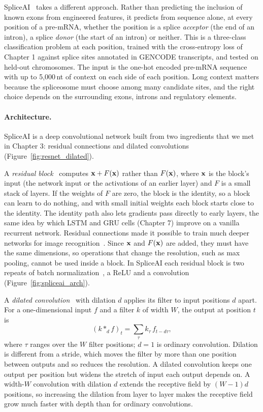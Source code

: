 SpliceAI~\citep{jaganathan2019} takes a different approach. Rather than predicting the inclusion of known exons from engineered features, it predicts from sequence alone, at every position of a pre-mRNA, whether the position is a splice \emph{acceptor} (the end of an intron), a splice \emph{donor} (the start of an intron) or neither. This is a three-class classification problem at each position, trained with the cross-entropy loss of Chapter 1 against splice sites annotated in GENCODE transcripts, and tested on held-out chromosomes. The input is the one-hot encoded pre-mRNA sequence with up to 5,000\,nt of context on each side of each position. Long context matters because the spliceosome must choose among many candidate sites, and the right choice depends on the surrounding exons, introns and regulatory elements.

\paragraph{Architecture.} SpliceAI is a deep convolutional network built from two ingredients that we met in Chapter 3: residual connections and dilated convolutions (Figure~\ref{fig:resnet_dilated}).

A \emph{residual block}~\citep{he2016} computes $\mathbf{x}+F(\mathbf{x})$ rather than $F(\mathbf{x})$, where $\mathbf{x}$ is the block's input (the network input or the activations of an earlier layer) and $F$ is a small stack of layers. If the weights of $F$ are zero, the block is the identity, so a block can learn to do nothing, and with small initial weights each block starts close to the identity. The identity path also lets gradients pass directly to early layers, the same idea by which LSTM and GRU cells (Chapter 7) improve on a vanilla recurrent network. Residual connections made it possible to train much deeper networks for image recognition~\citep{he2016}. Since $\mathbf{x}$ and $F(\mathbf{x})$ are added, they must have the same dimensions, so operations that change the resolution, such as max pooling, cannot be used inside a block. In SpliceAI each residual block is two repeats of batch normalization~\citep{ioffe2015}, a ReLU and a convolution (Figure~\ref{fig:spliceai_arch}).

A \emph{dilated convolution}~\citep{yu2016} with dilation $d$ applies its filter to input positions $d$ apart. For a one-dimensional input $f$ and a filter $k$ of width $W$, the output at position $t$ is
\begin{equation}
  (k *_d f)_t = \sum_{\tau} k_\tau\, f_{t-d\tau},
\end{equation}
where $\tau$ ranges over the $W$ filter positions; $d=1$ is ordinary convolution. Dilation is different from a stride, which moves the filter by more than one position between outputs and so reduces the resolution. A dilated convolution keeps one output per position but widens the stretch of input each output depends on. A width-$W$ convolution with dilation $d$ extends the receptive field by $(W-1)d$ positions, so increasing the dilation from layer to layer makes the receptive field grow much faster with depth than for ordinary convolutions.

